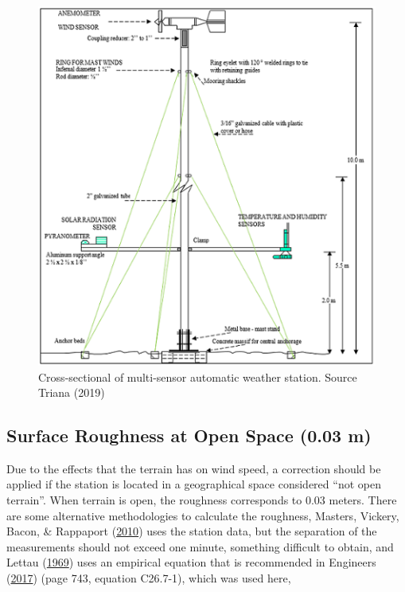 \documentclass[12pt,oneside]{reedthesis}
\begin{document}
\footnotesize
\begin{figure}

{\centering \includegraphics[width=6.12in]{figure/anemometer} 

}

\caption{Cross-sectional of multi-sensor automatic weather station. Source Triana (2019)}\label{fig:anemometer}
\end{figure}
\normalsize

\hypertarget{surface-roughness-at-open-space-0.03-m}{%
\subsection{Surface Roughness at Open Space (0.03 m)}\label{surface-roughness-at-open-space-0.03-m}}

Due to the effects that the terrain has on wind speed, a correction should be applied if the station is located in a geographical space considered ``not open terrain''. When terrain is open, the roughness corresponds to 0.03 meters. There are some alternative methodologies to calculate the roughness, Masters, Vickery, Bacon, \& Rappaport (\protect\hyperlink{ref-Masters2010}{2010}) uses the station data, but the separation of the measurements should not exceed one minute, something difficult to obtain, and Lettau (\protect\hyperlink{ref-Lettau1969}{1969}) uses an empirical equation that is recommended in Engineers (\protect\hyperlink{ref-Asce2017}{2017}) (page 743, equation C26.7-1), which was used here,
\end{document}
